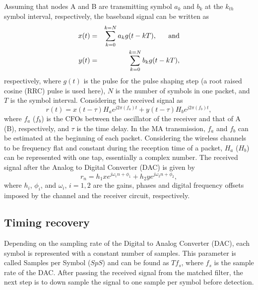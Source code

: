 Assuming that nodes A and B are transmitting symbol $a_k$ and $b_k$ at the $k_{th}$ symbol interval, respectively, the baseband signal can be written as
\begin{eqnarray}
    x(t)&=&\sum_{k=0}^{k=N} a_k g(t-kT), {\rm \ \ \ \ \ and}\\
    y(t)&=&\sum_{k=0}^{k=N} b_k g(t-kT),
\end{eqnarray}
respectively, where $g(t)$ is the pulse for the pulse shaping step (a root raised cosine (RRC) pulse is used here), $N$ is the number of symbols in one packet, and $T$ is the symbol interval. Considering the received signal as
\begin{equation}
    r(t)=x(t- \tau) H_a e^{j2\pi (f_a)t} + y(t - \tau) H_b e^{j2\pi (f_b)t},
\end{equation}
where $f_a$ ($f_b$) is the CFOs between the oscillator of the receiver and  that of A (B), respectively, and $\tau$ is the time delay. In the MA transmission, $f_a$ and $f_b$ can be estimated at the beginning of each packet. Considering the wireless channels to be frequency flat and constant during the reception time of a packet, %
$H_a$ ($H_b$) can be represented with one tap, essentially a complex number. The received signal after the Analog to Digital Converter (DAC) is given by
\begin{equation}
    r_n=h_1 x e^{j \omega_1 n + \phi_1} + h_2 y e^{j \omega_2 n + \phi_2},
\end{equation}
where $h_i$, $\phi_i$, and $\omega_i$, $i=1,2$ are the gains, phases and digital frequency offsets imposed by the channel and  the receiver circuit, respectively. 

\subsection{Timing recovery}

Depending on the sampling rate of the Digital to Analog Converter (DAC), each symbol is represented with a constant number of samples. This parameter is called Samples per Symbol ($SpS$) and can be found as ${T}{f_s}$, where $f_s$ is  the sample rate of the DAC. After passing the received signal from the matched filter, the next step is to down sample the signal to one sample per symbol before detection. 

